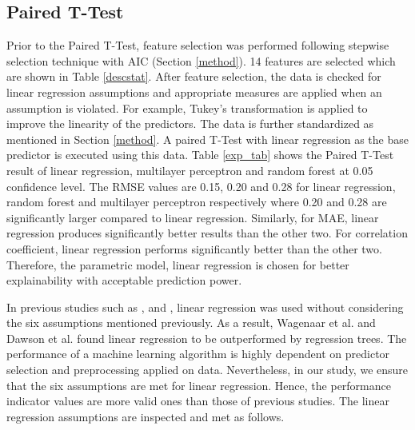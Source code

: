 \documentclass[preprint,review,12pt]{elsarticle}
\begin{document}
\subsection{Paired T-Test}
\label{ttest}
Prior to the Paired T-Test, feature selection was performed following stepwise selection technique with AIC (Section \ref{method}). 14 features are selected which are shown in Table \ref{descstat}. After feature selection, the data is checked for linear regression assumptions and appropriate measures are applied when an assumption is violated. For example, Tukey's transformation is applied to improve the linearity of the predictors. The data is further standardized as mentioned in Section \ref{method}. A paired T-Test with linear regression as the base predictor is executed using this data. Table \ref{exp_tab} shows the Paired T-Test result of linear regression, multilayer perceptron and random forest at 0.05 confidence level. The RMSE values are 0.15, 0.20 and 0.28 for linear regression, random forest and multilayer perceptron respectively where 0.20 and 0.28 are significantly larger compared to linear regression. Similarly, for MAE, linear regression produces significantly better results than the other two. For correlation coefficient, linear regression performs significantly better than the other two. Therefore, the parametric model, linear regression is chosen for better explainability with acceptable prediction power. 

In previous studies such as \cite{poussin2014factors},  \cite{wagenaar2017multi} and \cite{dawson2008attribution}, linear regression was used without considering the six assumptions mentioned previously. As a result, Wagenaar et al. and Dawson et al. found linear regression to be outperformed by regression trees. The performance of a machine learning algorithm is highly dependent on predictor selection and preprocessing applied on data. Nevertheless, in our study, we ensure that the six assumptions are met for linear regression. Hence, the performance indicator values are more valid ones than those of previous studies. The linear regression assumptions are inspected and met as follows.
\end{document}

